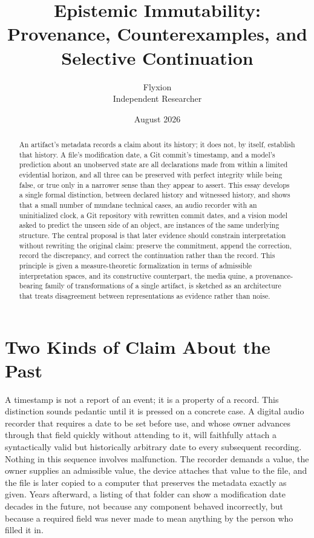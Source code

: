\documentclass[11pt]{article}
\title{Epistemic Immutability: Provenance, Counterexamples, and Selective Continuation}
\author{Flyxion \\ \small Independent Researcher}
\date{August 2026}
\begin{document}
\maketitle

\begin{abstract}
An artifact's metadata records a claim about its history; it does not, by itself, establish that history. A file's modification date, a Git commit's timestamp, and a model's prediction about an unobserved state are all declarations made from within a limited evidential horizon, and all three can be preserved with perfect integrity while being false, or true only in a narrower sense than they appear to assert. This essay develops a single formal distinction, between declared history and witnessed history, and shows that a small number of mundane technical cases, an audio recorder with an uninitialized clock, a Git repository with rewritten commit dates, and a vision model asked to predict the unseen side of an object, are instances of the same underlying structure. The central proposal is that later evidence should constrain interpretation without rewriting the original claim: preserve the commitment, append the correction, record the discrepancy, and correct the continuation rather than the record. This principle is given a measure-theoretic formalization in terms of admissible interpretation spaces, and its constructive counterpart, the media quine, a provenance-bearing family of transformations of a single artifact, is sketched as an architecture that treats disagreement between representations as evidence rather than noise.
\end{abstract}

\section{Two Kinds of Claim About the Past}

A timestamp is not a report of an event; it is a property of a record. This distinction sounds pedantic until it is pressed on a concrete case. A digital audio recorder that requires a date to be set before use, and whose owner advances through that field quickly without attending to it, will faithfully attach a syntactically valid but historically arbitrary date to every subsequent recording. Nothing in this sequence involves malfunction. The recorder demands a value, the owner supplies an admissible value, the device attaches that value to the file, and the file is later copied to a computer that preserves the metadata exactly as given. Years afterward, a listing of that folder can show a modification date decades in the future, not because any component behaved incorrectly, but because a required field was never made to mean anything by the person who filled it in.
\end{document}
